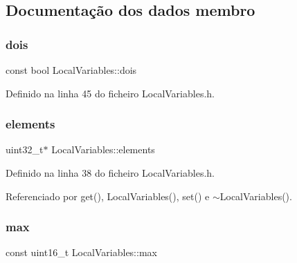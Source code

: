 \subsection{Documentação dos dados membro}
\mbox{\label{classLocalVariables_a8357edb6ae793a8f031ae3733751e1fc}} 
\subsubsection{\texorpdfstring{dois}{dois}}
{\footnotesize\ttfamily const bool Local\+Variables\+::dois\hspace{0.3cm}{\ttfamily [private]}}



Definido na linha 45 do ficheiro Local\+Variables.\+h.

\mbox{\label{classLocalVariables_a0015e9d8a61d4643f6f3594785467ae4}} 
\subsubsection{\texorpdfstring{elements}{elements}}
{\footnotesize\ttfamily uint32\+\_\+t$\ast$ Local\+Variables\+::elements\hspace{0.3cm}{\ttfamily [private]}}



Definido na linha 38 do ficheiro Local\+Variables.\+h.



Referenciado por get(), Local\+Variables(), set() e $\sim$\+Local\+Variables().

\mbox{\label{classLocalVariables_a55f33aaf9a0af5176d460616402c4aeb}} 
\subsubsection{\texorpdfstring{max}{max}}
{\footnotesize\ttfamily const uint16\+\_\+t Local\+Variables\+::max\hspace{0.3cm}{\ttfamily [private]}}



